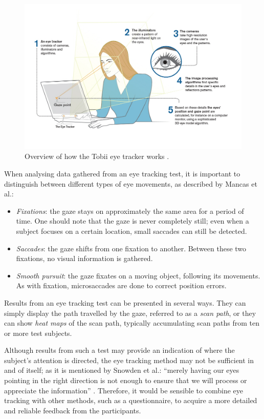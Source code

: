 \begin{figure}[h!]
	\centering
	\includegraphics[width=\textwidth]{figures/tobii.jpg}
	\caption{Overview of how the Tobii eye tracker works \cite{TobiiPro}.\label{fig:tobii}}
\end{figure}

When analysing data gathered from an eye tracking test, it is important to distinguish between different types of eye movements, as described by Mancas et al.:

\begin{itemize}
\item \textit{Fixations}: the gaze stays on approximately the same area for a period of time. One should note that the gaze is never completely still; even when a subject focuses on a certain location, small saccades can still be detected.
\item \textit{Saccades}: the gaze shifts from one fixation to another. Between these two fixations, no visual information is gathered.
\item \textit{Smooth pursuit}: the gaze fixates on a moving object, following its movements. As with fixation, microsaccades are done to correct position errors.
\end{itemize}

Results from an eye tracking test can be presented in several ways. They can simply display the path travelled by the gaze, referred to as a \textit{scan path}, or they can show \textit{heat maps} of the scan path, typically accumulating scan paths from ten or more test subjects. 

Although results from such a test may provide an indication of where the subject’s attention is directed, the eye tracking method may not be sufficient in and of itself; as it is mentioned by Snowden et al.: “merely having our eyes pointing in the right direction is not enough to ensure that we will process or appreciate the information” \cite{snowden2012basic}. Therefore, it would be sensible to combine eye tracking with other methods, such as a questionnaire, to acquire a more detailed and reliable feedback from the participants.
